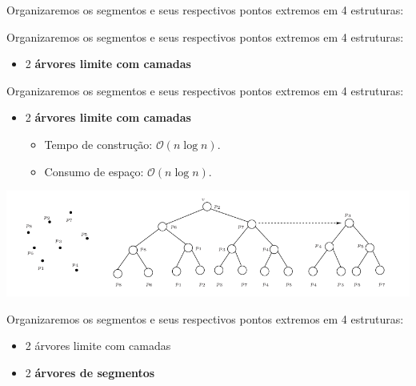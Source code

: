 \documentclass[
paper=128mm:96mm, %
fontsize=11pt, %
pagesize, %
parskip=half-, %
]{scrartcl} %
\newcommand*{\myblack}[1]{\textcolor{myblack}{#1}}
\theoremstyle{mythmstyle} %
\begin{document}
\clearpage

\begin{flushleft}
  Organizaremos os segmentos e seus respectivos pontos extremos em 4 estruturas:
\end{flushleft}
  
\clearpage


\begin{flushleft}
  Organizaremos os segmentos e seus respectivos pontos extremos em 4 estruturas:

  \begin{itemize}
  \item 2 \textbf{\myblack{árvores limite com camadas}}
  \end{itemize}
\end{flushleft}
  
\clearpage


\begin{flushleft}
  Organizaremos os segmentos e seus respectivos pontos extremos em 4 estruturas:

  \begin{itemize}
  \item 2 \textbf{\myblack{árvores limite com camadas}}
    \begin{itemize}
      \item Tempo de construção: $\mathcal{O}(n \log n)$.
      \item Consumo de espaço: $\mathcal{O}(n \log n)$.
    \end{itemize}
  \end{itemize}
\end{flushleft}

\clearpage


\includegraphics[width=\textwidth,height=0.55\textheight]{3}
\clearpage



\begin{flushleft}
  Organizaremos os segmentos e seus respectivos pontos extremos em 4 estruturas:

  \begin{itemize}
  \item 2 árvores limite com camadas
  \item 2 \textbf{\myblack{árvores de segmentos}}
  \end{itemize}
\end{flushleft}
  
\end{document}
